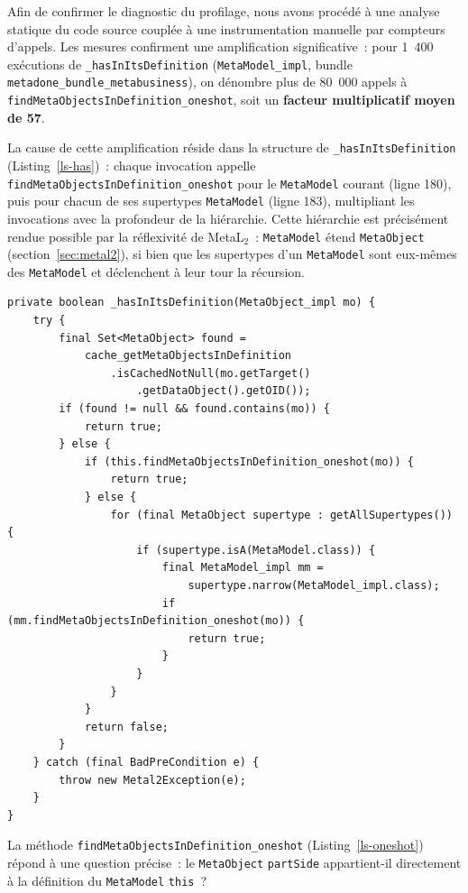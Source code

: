 Afin de confirmer le diagnostic du profilage, nous avons procédé à une
analyse statique du code source couplée à une instrumentation manuelle par
compteurs d'appels. Les mesures confirment une amplification significative~:
pour 1~400 exécutions de \texttt{\_hasInItsDefinition}
(\texttt{MetaModel\_impl}, bundle \texttt{metadone\_bundle\_metabusiness}),
on dénombre plus de 80~000 appels à
\texttt{findMetaObjectsInDefinition\_oneshot}, soit un \textbf{facteur
multiplicatif moyen de 57}.

La cause de cette amplification réside dans la structure de \texttt{\_hasInItsDefinition} (Listing~\ref{ls-has})~: chaque invocation appelle \texttt{findMetaObjectsInDefinition\_oneshot} pour le \texttt{MetaModel} courant (ligne 180), puis pour chacun de ses supertypes \texttt{MetaModel} (ligne 183), multipliant les invocations avec la profondeur de la hiérarchie. Cette hiérarchie est précisément rendue possible par la réflexivité de MetaL$_2$~: \texttt{MetaModel} étend \texttt{MetaObject} (section~\ref{sec:metal2}), si bien que les supertypes d'un \texttt{MetaModel} sont eux-mêmes des \texttt{MetaModel} et déclenchent à leur tour la récursion.

\begin{lstlisting}[firstnumber=174,
  caption={Méthode \texttt{\_hasInItsDefinition} ---
  classe \texttt{MetaModel\_impl},
  bundle \texttt{metadone\_bundle\_metabusiness}},
  label={ls-has}]
private boolean _hasInItsDefinition(MetaObject_impl mo) {
    try {
        final Set<MetaObject> found =
            cache_getMetaObjectsInDefinition
                .isCachedNotNull(mo.getTarget()
                    .getDataObject().getOID());
        if (found != null && found.contains(mo)) {
            return true;
        } else {
            if (this.findMetaObjectsInDefinition_oneshot(mo)) {
                return true;
            } else {
                for (final MetaObject supertype : getAllSupertypes()) {
                    if (supertype.isA(MetaModel.class)) {
                        final MetaModel_impl mm =
                            supertype.narrow(MetaModel_impl.class);
                        if (mm.findMetaObjectsInDefinition_oneshot(mo)) {
                            return true;
                        }
                    }
                }
            }
            return false;
        }
    } catch (final BadPreCondition e) {
        throw new Metal2Exception(e);
    }
}
\end{lstlisting}

La méthode \texttt{findMetaObjectsInDefinition\_oneshot}
(Listing~\ref{ls-oneshot}) répond à une question précise~: le
\texttt{MetaObject} \texttt{partSide} appartient-il directement à la
définition du \texttt{MetaModel} \texttt{this}~?

